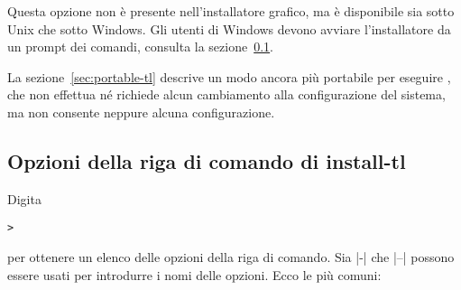\documentclass{article}
\begin{document}
Questa opzione non è presente nell'installatore grafico, ma è disponibile
sia sotto Unix che sotto Windows. Gli utenti di Windows devono avviare
l'installatore da un prompt dei comandi, consulta la
sezione~\ref{sec:cmdline}.

La sezione~\ref{sec:portable-tl} descrive un modo ancora più portabile per
eseguire \TL, che non effettua né richiede alcun cambiamento alla
configurazione del sistema, ma non consente neppure alcuna configurazione.

\subsection{Opzioni della riga di comando di install-tl}
\label{sec:cmdline}

Digita
\begin{alltt}
> 
\end{alltt}
per ottenere un elenco delle opzioni della riga di comando. Sia |-| che
|--| possono essere usati per introdurre i nomi delle opzioni. Ecco le più
comuni:
\end{document}
